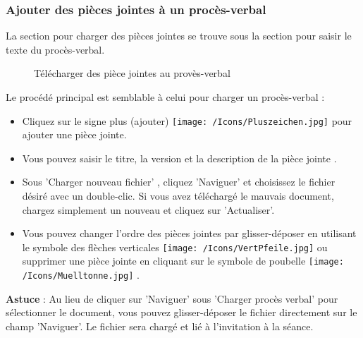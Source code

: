 \subsubsection{Ajouter des pièces jointes à un procès-verbal}

La section pour charger des pièces jointes se trouve sous la section pour saisir le texte du procès-verbal.

\begin{figure}[H]
\caption{Télécharger des pièce jointes au provès-verbal}
\end{figure}

Le procédé principal est semblable à celui pour charger un procès-verbal :

\begin{itemize}
\item
Cliquez sur le signe plus (ajouter) \texttt{[image: /Icons/Pluszeichen.jpg]}  pour ajouter une pièce jointe.
\item
Vous pouvez saisir le titre, la version et la description de la pièce jointe .
\item
Sous 'Charger nouveau fichier' , cliquez 'Naviguer' et choisissez le fichier désiré avec un double-clic. Si vous avez téléchargé le mauvais document, chargez simplement un nouveau et cliquez sur 'Actualiser'.
\item
Vous pouvez changer l'ordre des pièces jointes par glisser-déposer en utilisant le symbole des flèches verticales \texttt{[image: /Icons/VertPfeile.jpg]}  ou supprimer une pièce jointe en cliquant sur le symbole de poubelle \texttt{[image: /Icons/Muelltonne.jpg]} .
\end{itemize}

\vspace{\baselineskip}

\textbf{Astuce} : Au lieu de cliquer sur 'Naviguer' sous 'Charger procès verbal' pour sélectionner le document, vous pouvez glisser-déposer le fichier directement sur le champ 'Naviguer'. Le fichier sera chargé et lié à l'invitation à la séance.

